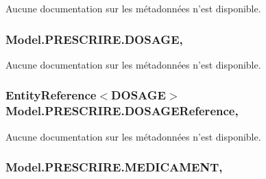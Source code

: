 Aucune documentation sur les métadonnées n'est disponible. 

\hypertarget{class_model_1_1_p_r_e_s_c_r_i_r_e_a1af2abaa082cabb9c53e3e16e1aab6ba}{
\subsubsection[{D\-O\-S\-A\-G\-E}]{ Model.\-P\-R\-E\-S\-C\-R\-I\-R\-E.\-D\-O\-S\-A\-G\-E\hspace{0.3cm}{\ttfamily [get]}, {\ttfamily [set]}}}\label{class_model_1_1_p_r_e_s_c_r_i_r_e_a1af2abaa082cabb9c53e3e16e1aab6ba}


Aucune documentation sur les métadonnées n'est disponible. 

\hypertarget{class_model_1_1_p_r_e_s_c_r_i_r_e_a5b8a8b554f87bbf94855802f7bfb1815}{
\subsubsection[{D\-O\-S\-A\-G\-E\-Reference}]{\setlength{\rightskip}{0pt plus 5cm}Entity\-Reference$<${\bf D\-O\-S\-A\-G\-E}$>$ Model.\-P\-R\-E\-S\-C\-R\-I\-R\-E.\-D\-O\-S\-A\-G\-E\-Reference\hspace{0.3cm}{\ttfamily [get]}, {\ttfamily [set]}}}\label{class_model_1_1_p_r_e_s_c_r_i_r_e_a5b8a8b554f87bbf94855802f7bfb1815}


Aucune documentation sur les métadonnées n'est disponible. 

\hypertarget{class_model_1_1_p_r_e_s_c_r_i_r_e_ac2d56f6ccfeff98e9e4e75ebeb8a183b}{
\subsubsection[{M\-E\-D\-I\-C\-A\-M\-E\-N\-T}]{ Model.\-P\-R\-E\-S\-C\-R\-I\-R\-E.\-M\-E\-D\-I\-C\-A\-M\-E\-N\-T\hspace{0.3cm}{\ttfamily [get]}, {\ttfamily [set]}}}\label{class_model_1_1_p_r_e_s_c_r_i_r_e_ac2d56f6ccfeff98e9e4e75ebeb8a183b}


